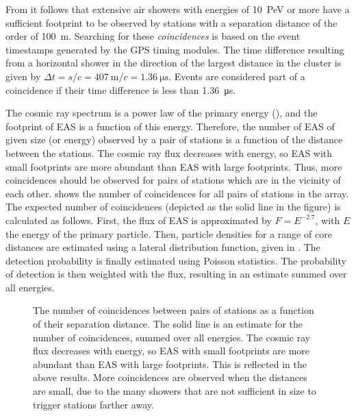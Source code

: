 From  it follows that extensive air showers with
energies of \SI{10}{\peta\electronvolt} or more have a sufficient footprint to
be observed by stations with a separation distance of the order of
\SI{100}{\meter}.
Searching for these \emph{coincidences} is based on the event timestamps
generated by the GPS timing modules.  The time difference resulting from a
horizontal shower in the direction of the largest distance in the cluster is
given by $\Delta t = s / c = \SI{407}{\meter} / c = \SI{1.36}{\micro\second}$.
Events are considered part of a coincidence if their time difference is
less than \SI{1.36}{\micro\second}.

The cosmic ray spectrum is a power law of the primary energy
(), and the footprint of EAS is a function of this
energy. Therefore, the number of EAS of given size (or energy) observed by a
pair of stations is a function of the distance between the stations.
The cosmic ray flux decreases with energy, so EAS with small footprints are more
abundant than EAS with large footprints.  Thus, more coincidences should be
observed for pairs of stations which are in the vicinity of each other.
 shows the number of coincidences for all
pairs of stations in the array.  The expected number of coincidences (depicted
as the solid line in the figure) is calculated as follows. First, the flux of
EAS is approximated by $F = E^{-2.7}$, with $E$ the energy of the primary
particle. Then, particle densities for a range of core distances are estimated
using a lateral distribution function, given in \cite{latpaper:2005}. The
detection probability is finally estimated using Poisson statistics. The
probability of detection is then weighted with the flux, resulting in an
estimate summed over all energies.

\begin{figure}
\centering

\caption{The number of coincidences between pairs of stations as a function of
their separation distance.  The solid line is an estimate for the number of
coincidences, summed over all energies. The cosmic ray flux decreases with
energy, so EAS with small footprints are more abundant than EAS with large
footprints.  This is reflected in the above results.  More coincidences are
observed when the distances are small, due to the many showers that are not
sufficient in size to trigger stations farther away.}
\label{fig:number-of-coincidences}
\end{figure}

